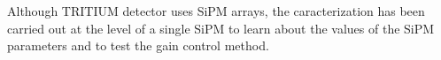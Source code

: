 Although TRITIUM detector uses SiPM arrays, the caracterization has been carried out at the level of a single SiPM to learn about the values of the SiPM parameters and to test the gain control method. %
